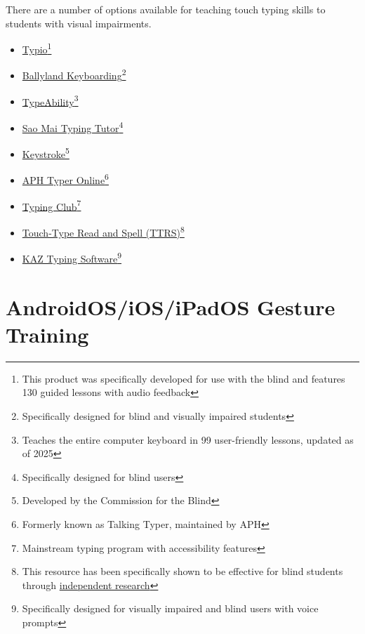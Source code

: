 There are a number of options available for teaching touch typing skills to students with visual impairments.
\begin{itemize}
 \item \href{https://www.accessibyte.com/typio-online-page/}{Typio}\footnote{\raggedright This product was specifically developed for use with the blind and features 130 guided lessons with audio feedback}
 \item \href{https://www.sonokids.org/ballyland-early-learning/ballyland-keyboarding/}{Ballyland Keyboarding}\footnote{\raggedright Specifically designed for blind and visually impaired students}
 \item \href{https://nelowvision.com/product/typeability-typing-and-computer-tutor-program-for-the-blind-and-visually-impaired/}{TypeAbility}\footnote{\raggedright Teaches the entire computer keyboard in 99 user-friendly lessons, updated as of 2025}
 \item \href{https://saomaicenter.org/en/smsoft/smtt}{Sao Mai Typing Tutor}\footnote{\raggedright Specifically designed for blind users}
 \item \href{https://www.cfb.state.nm.us/apps/}{Keystroke}\footnote{\raggedright Developed by the Commission for the Blind}
 \item \href{https://typer.aphtech.org/}{APH Typer Online}\footnote{\raggedright Formerly known as Talking Typer, maintained by APH}
 \item \href{https://www.typingclub.com/}{Typing Club}\footnote{\raggedright Mainstream typing program with accessibility features}
 \item \href{https://www.readandspell.com/us/typing-for-the-blind}{Touch-Type Read and Spell (TTRS)}\footnote{\raggedright This resource has been specifically shown to be effective for blind students through \href{https://www.readandspell.com/sites/default/files/Research/greenrich\_report\_-ttrs\_for\_visually\_imparied.pdf}{independent research}}
 \item \href{https://kaz-type.com/visualimpairment}{KAZ Typing Software}\footnote{\raggedright Specifically designed for visually impaired and blind users with voice prompts}
\end{itemize}

\section{AndroidOS/iOS/iPadOS Gesture Training}\label{appx6}

